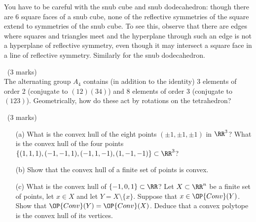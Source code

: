 \documentclass[12pt]{article}
\begin{document}
\begin{answer}
\begin{enumerate}
    You have to be careful with the snub cube and snub dodecahedron: though there are 6 square faces of a snub cube, none of the reflective symmetries of the square extend to symmetries of the snub cube. To see this, observe that there are edges where squares and triangles meet and the hyperplane through such an edge is not a hyperplane of reflective symmetry, even though it may intersect a square face in a line of reflective symmetry. Similarly for the snub dodecahedron.
  \end{enumerate}
\end{answer}
\fi

\newpage

\begin{question}\ (3 marks)\\
  The alternating group $A_4$ contains (in addition to the identity) 3 elements of order 2 (conjugate to $(12)(34)$) and 8 elements of order 3 (conjugate to $(123)$). Geometrically, how do these act by rotations on the tetrahedron?
\end{question}

\iffalse
\begin{answer}
The even order 2 elements are rotations by $\pi$ radians in an axis through the midpoints of opposite edges. The order 3 elements are rotations by $2\pi/3$ radians in an axis through a vertex and the midpoint of the opposite face.
\end{answer}
\newpage
\fi

\vspace{1cm}

\begin{question}\ (3 marks)
  \begin{enumerate}
  \item[(a)] What is the convex hull of the eight points $(\pm 1,\pm 1,\pm 1)$ in $\RR^3$? What is the convex hull of the four points $\{(1,1,1),(-1,-1,1),(-1,1,-1),(1,-1,-1)\}\subset\RR^3$?
  \item[(b)] Show that the convex hull of a finite set of points is convex.
  \item[(c)] What is the convex hull of $\{-1,0,1\}\subset\RR$? Let $X\subset\RR^n$ be a finite set of points, let $x\in X$ and let $Y=X\setminus\{x\}$. Suppose that $x\in\OP{Conv}(Y)$. Show that $\OP{Conv}(Y)=\OP{Conv}(X)$. Deduce that a convex polytope is the convex hull of its vertices.
  \end{enumerate}
\end{question}
\end{document}
